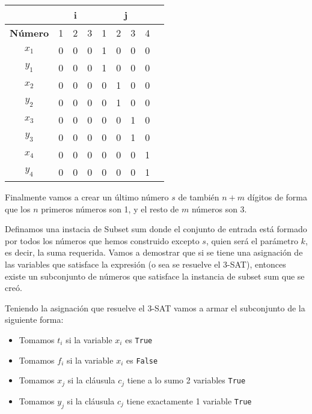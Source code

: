\documentclass[11pt]{article}
\begin{document}
    \begin{table}[!h]
        \centering
        \begin{tabular}{|c|c|c|c|c|c|c|c|c|}
        \hline
        \multicolumn{1}{|c|}{} & \multicolumn{3}{c|}{\textbf{i}} & \multicolumn{4}{c|}{\textbf{j}} \\ \hline
        \textbf{Número} & 1 & 2 & 3 & 1 & 2 & 3 & 4 \\ \hline
        $x_1$ & 0 & 0 & 0 & 1 & 0 & 0 & 0 \\ \hline
        $y_1$ & 0 & 0 & 0 & 1 & 0 & 0 & 0 \\ \hline
        $x_2$ & 0 & 0 & 0 & 0 & 1 & 0 & 0 \\ \hline
        $y_2$ & 0 & 0 & 0 & 0 & 1 & 0 & 0 \\ \hline
        $x_3$ & 0 & 0 & 0 & 0 & 0 & 1 & 0 \\ \hline
        $y_3$ & 0 & 0 & 0 & 0 & 0 & 1 & 0 \\ \hline
        $x_4$ & 0 & 0 & 0 & 0 & 0 & 0 & 1 \\ \hline
        $y_4$ & 0 & 0 & 0 & 0 & 0 & 0 & 1 \\ \hline
        \end{tabular}
    \end{table}

    Finalmente vamos a crear un último número $s$ de también $n+m$ dígitos de forma que los $n$ primeros números
    son 1, y el resto de $m$ números son 3. 
    
    Definamos una instacia de Subset sum donde el conjunto de entrada está formado por todos los números que hemos 
    construido excepto $s$, quien será el parámetro $k$, es decir, la suma requerida. Vamos a demostrar que si se 
    tiene una asignación de las variables que satisface la expresión (o sea se resuelve el 3-SAT), entonces existe un 
    subconjunto de números que satisface la instancia de subset sum que se creó.

    Teniendo la asignación que resuelve el 3-SAT vamos a armar el subconjunto de la siguiente forma:

    \begin{itemize}
        \item Tomamos $t_i$ si la variable $x_i$ es \texttt{True}
        \item Tomamos $f_i$ si la variable $x_i$ es \texttt{False}
        \item Tomamos $x_j$ si la cláusula $c_j$ tiene a lo sumo 2 variables \texttt{True}
        \item Tomamos $y_j$ si la cláusula $c_j$ tiene exactamente 1 variable \texttt{True}
    \end{itemize}
\end{document}
